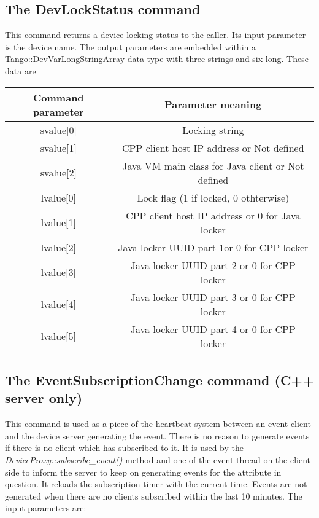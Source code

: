 \subsection{The DevLockStatus command}

This command returns a device locking status to the caller. Its input
parameter is the device name. The output parameters are embedded within
a Tango::DevVarLongStringArray data type with three strings and six
long. These data are\vspace{0.3cm}


\begin{center}
\begin{longtable}{|c|c|}
\hline 
Command parameter & Parameter meaning\tabularnewline
\hline 
\hline 
svalue{[}0{]} & Locking string\tabularnewline
\hline 
svalue{[}1{]} & CPP client host IP address or \textquotedbl{}Not defined\textquotedbl{}\tabularnewline
\hline 
svalue{[}2{]} & Java VM main class for Java client or \textquotedbl{}Not defined\textquotedbl{}\tabularnewline
\hline 
lvalue{[}0{]} & Lock flag (1 if locked, 0 othterwise)\tabularnewline
\hline 
lvalue{[}1{]} & CPP client host IP address or 0 for Java locker\tabularnewline
\hline 
lvalue{[}2{]} & Java locker UUID part 1or 0 for CPP locker\tabularnewline
\hline 
lvalue{[}3{]} & Java locker UUID part 2 or 0 for CPP locker\tabularnewline
\hline 
lvalue{[}4{]} & Java locker UUID part 3 or 0 for CPP locker\tabularnewline
\hline 
lvalue{[}5{]} & Java locker UUID part 4 or 0 for CPP locker\tabularnewline
\hline 
\end{longtable}
\par\end{center}

\vspace{0.3cm}



\subsection{The EventSubscriptionChange command
(C++ server only)}

This command is used as a piece of the \textquotedbl{}heartbeat\textquotedbl{}
system between an event client and the device server generating the
event. There is no reason to generate events if there is no client
which has subscribed to it. It is used by the \emph{DeviceProxy::subscribe\_event()}
method and one of the event thread on the client side to inform the
server to keep on generating events for the attribute in question.
It reloads the subscription timer with the current time. Events are
not generated when there are no clients subscribed within the last
10 minutes. The input parameters are:

